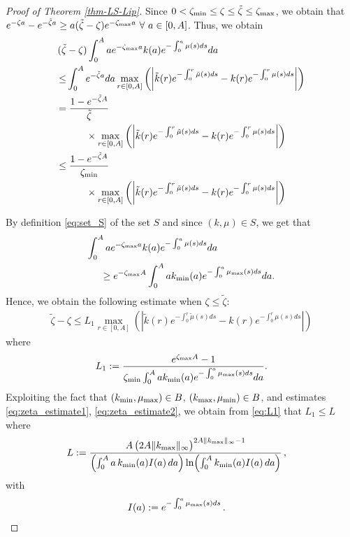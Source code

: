 \documentclass[journal,twoside,web]{ieeecolor}
\begin{document}
\begin{proof}[Proof of Theorem \ref{thm-LS-Lip}]
Since $0 < \zeta_{\rm min} \leq \zeta \leq \tilde{\zeta} \leq \zeta_{\rm max}$, we obtain that
$ e^{-\zeta a} - e^{-\tilde{\zeta}a} \geq a(\tilde{\zeta}-\zeta)e^{-\zeta_{\rm max} a} \ \forall \ a \in [0,A]$. Thus, we obtain
\begin{align}
(\tilde{\zeta}&-\zeta) \int_0^A a e^{-\zeta_{\rm max} a} k(a) e^{-\int_0^a {\mu}(s) ds} da \notag \\
\leq& \int_0^A e^{-\tilde{\zeta}a} da \max_{r \in [0,A]}
\left( \left| \tilde{k}(r) e^{-\int_0^r \tilde{\mu}(s) ds } - k(r) e^{-\int_0^r \mu(s) ds} \right| \right) \notag \\
=&\; \frac{1 - e^{-\tilde{\zeta} A}}{\tilde{\zeta}}
\nonumber  \\ & \qquad \times \max_{r \in [0,A]} 
\left( \left| \tilde{k}(r) e^{-\int_0^r \tilde{\mu}(s) ds } - k(r) e^{-\int_0^r \mu(s) ds} \right| \right) \notag \\
\leq&\;  \frac{1 -e^{-\tilde{\zeta} A}}{\zeta_{\rm min}} \notag  \\ & \qquad \times
\max_{r \in [0,A]} 
\left( \left| \tilde{k}(r) e^{-\int_0^r \tilde{\mu}(s) ds } - k(r) e^{-\int_0^r \mu(s) ds} \right| \right)
\end{align}

By definition \eqref{eq:set_S} of the set $S$ and since $(k,\mu) \in S$, we get that
\begin{align}
\int_0^A a &e^{-\zeta_{\rm max} a} k(a) e^{-\int_0^a \mu(s) ds} da \\ \geq&\;   
e^{-\zeta_{\rm max} A} \int_0^A a k_{\rm min}(a) e^{-\int_0^a \mu_{\rm max}(s) ds} da.
\end{align}
Hence, we obtain the following estimate when $\zeta \leq \tilde{\zeta}$:
\begin{align}
\tilde{\zeta} - \zeta \leq L_1 \max_{r \in [0,A]} 
\left( \left| \tilde{k}(r) e^{-\int_0^r \tilde{\mu}(s) ds } - k(r) e^{-\int_0^r \mu(s) ds} \right| \right)
\end{align}
where
\begin{align}
L_1 := \frac{e^{\zeta_{\rm max} A} - 1}{\zeta_{\rm min} \int_0^A a k_{\rm min}(a) e^{-\int_0^a \mu_{\rm max}(s) ds } da } .\label{eq:L1}
\end{align}
Exploiting the fact that $(k_{\rm min},\mu_{\rm max})\in B$, $(k_{\rm max},\mu_{\rm min})\in B$, and estimates \eqref{eq:zeta_estimate1}, \eqref{eq:zeta_estimate2}, we obtain from \eqref{eq:L1} that $L_1 \leq L$ where 
\begin{align}
L :=\;&
\frac{
A\,\bigl(2A\|k_{\rm max}\|_\infty\bigr)^{2A\|k_{\rm max}\|_\infty-1}
}{
\left(\int_0^A a\,k_{\rm min}(a)I(a)\,da\right)
\ln\!\left(\int_0^A k_{\rm min}(a)I(a)\,da\right)
}\,,  
\end{align}
with
\begin{align}
    I(a) :=\;& e^{-\int_0^a \mu_{\rm max}(s) ds }\,.
\end{align}


\end{proof}
\end{document}
